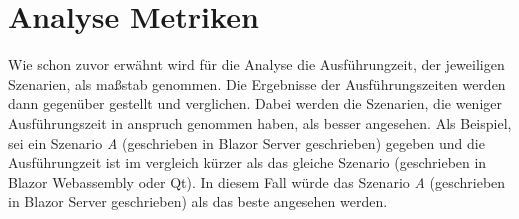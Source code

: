 \section{Analyse Metriken}
\label{sec:metriken}
Wie schon zuvor erwähnt wird für die Analyse die Ausführungzeit, der jeweiligen Szenarien, als
maßstab genommen. Die Ergebnisse der Ausführungszeiten werden dann gegenüber gestellt und
verglichen. Dabei werden die Szenarien, die weniger Ausführungszeit in anspruch genommen haben,
als besser angesehen.
\newline
\newline
Als Beispiel, sei ein Szenario \emph{A} (geschrieben in Blazor Server geschrieben) gegeben und die
Ausführungzeit ist im vergleich kürzer als das gleiche Szenario (geschrieben in Blazor Webassembly
oder Qt). In diesem Fall würde das Szenario \emph{A} (geschrieben in Blazor Server geschrieben)
als das beste angesehen werden.
